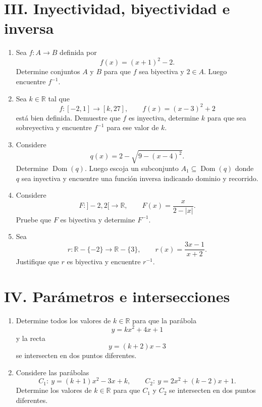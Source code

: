 \documentclass[letterpaper, 12pt]{article}
\newcommand{\R}{\mathbb{R}}
\newcommand{\Dom}{\operatorname{Dom}}
\begin{document}
\section*{III. Inyectividad, biyectividad e inversa}

\begin{enumerate}[label=\color{azulFuerte}\bfseries 3.\arabic*., leftmargin=*, itemsep=1em]
    \item Sea $f:A\to B$ definida por
    \[
        f(x)=(x+1)^2-2.
    \]
    Determine conjuntos $A$ y $B$ para que $f$ sea biyectiva y $2\in A$. Luego encuentre $f^{-1}$.

    \item Sea $k\in\R$ tal que
    \[
        f:[-2,1]\to[k,27],
        \qquad
        f(x)=(x-3)^2+2
    \]
    est\'a bien definida. Demuestre que $f$ es inyectiva, determine $k$ para que sea sobreyectiva y encuentre $f^{-1}$ para ese valor de $k$.

    \item Considere
    \[
        q(x)=2-\sqrt{9-(x-4)^2}.
    \]
    Determine $\Dom(q)$. Luego escoja un subconjunto $A_1\subseteq \Dom(q)$ donde $q$ sea inyectiva y encuentre una funci\'on inversa indicando dominio y recorrido.

    \item Considere
    \[
        F:]-2,2[\to\R,
        \qquad
        F(x)=\frac{x}{2-|x|}.
    \]
    Pruebe que $F$ es biyectiva y determine $F^{-1}$.

    \item Sea
    \[
        r:\R-\{-2\}\to\R-\{3\},
        \qquad
        r(x)=\frac{3x-1}{x+2}.
    \]
    Justifique que $r$ es biyectiva y encuentre $r^{-1}$.
\end{enumerate}

\section*{IV. Par\'ametros e intersecciones}

\begin{enumerate}[label=\color{azulFuerte}\bfseries 4.\arabic*., leftmargin=*, itemsep=1em]
    \item Determine todos los valores de $k\in\R$ para que la par\'abola
    \[
        y=kx^2+4x+1
    \]
    y la recta
    \[
        y=(k+2)x-3
    \]
    se intersecten en dos puntos diferentes.

    \item Considere las par\'abolas
    \[
        C_1:\ y=(k+1)x^2-3x+k,
        \qquad
        C_2:\ y=2x^2+(k-2)x+1.
    \]
    Determine los valores de $k\in\R$ para que $C_1$ y $C_2$ se intersecten en dos puntos diferentes.
\end{enumerate}
\end{document}
